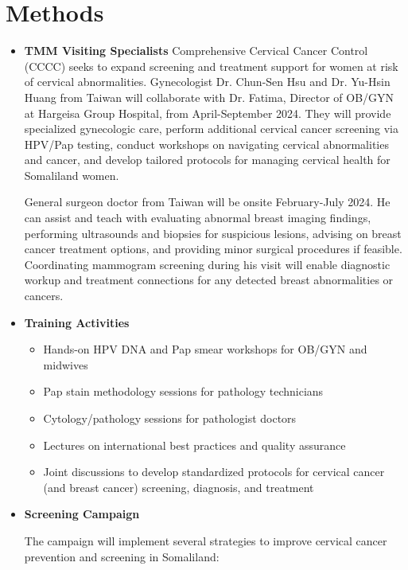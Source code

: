 \documentclass{article}
\begin{document}
\section{Methods}
\begin{itemize}

\item[] \textbf{TMM Visiting Specialists}
Comprehensive Cervical Cancer Control (CCCC) seeks to expand screening and treatment support for women at risk of cervical abnormalities. 
Gynecologist Dr. Chun-Sen Hsu and Dr. Yu-Hsin Huang from Taiwan will collaborate with Dr. Fatima, Director of OB/GYN at Hargeisa Group Hospital, from April-September 2024.
They will provide specialized gynecologic care, perform additional cervical cancer screening via HPV/Pap testing, conduct workshops on navigating cervical abnormalities and cancer, and develop tailored protocols for managing cervical health for Somaliland women.

General surgeon doctor from Taiwan will be onsite February-July 2024. He can assist and teach with evaluating abnormal breast imaging findings, performing ultrasounds and biopsies for suspicious lesions, advising on breast cancer treatment options, and providing minor surgical procedures if feasible. Coordinating mammogram screening during his visit will enable diagnostic workup and treatment connections for any detected breast abnormalities or cancers.

\item[]\textbf{Training Activities}

\begin{itemize}
\item Hands-on HPV DNA and Pap smear workshops for OB/GYN and midwives
\item Pap stain methodology sessions for pathology technicians
\item Cytology/pathology sessions for pathologist doctors
\item Lectures on international best practices and quality assurance
\item Joint discussions to develop standardized protocols for cervical cancer (and breast cancer) screening, diagnosis, and treatment

\end{itemize}

\item[]\textbf{Screening Campaign}


The campaign will implement several strategies to improve cervical cancer prevention and screening in Somaliland: 


\end{itemize}
\end{document}
